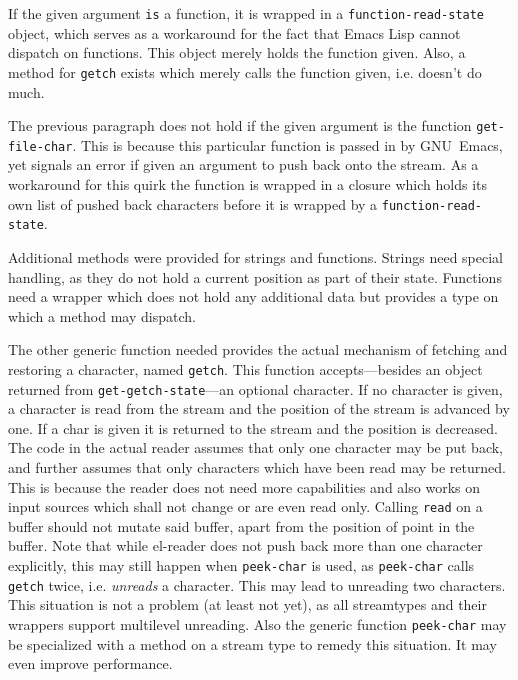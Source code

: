 \documentclass[a4paper,10pt,twoside]{report}
\newcommand{\el}{Emacs Lisp}
\newcommand{\elr}{el-reader}
\newcommand{\sym}[1]{\texttt{#1}}
\newcommand{\fun}[1]{\texttt{#1}}
\newcommand{\emacs}{GNU~Emacs}
\newcommand{\Read}{\fun{read}}
\begin{document}

If the given argument \texttt{is} a function, it is wrapped in a
\sym{function-read-state} object, which serves as a workaround for
the fact that \el{} cannot dispatch on functions.  This object merely holds the
function given.  Also, a method for \fun{getch} exists which merely
calls the function given, i.e. doesn't do much.

The previous paragraph does not hold if the given argument is the function
\fun{get-file-char}.  This is because this particular function is passed in by
\emacs{}, yet signals an error if given an argument to push back onto the
stream.  As a workaround for this quirk the function is wrapped in a closure
which holds its own list of pushed back characters before it is wrapped by a
\sym{function-read-state}.

Additional methods were provided for strings and functions.  Strings need
special handling, as they do not hold a current position as part of their
state.  Functions need a wrapper which does not hold any additional data but
provides a type on which a method may dispatch.

The other generic function needed provides the actual mechanism of fetching and
restoring a character, named \fun{getch}.  This function accepts---besides an
object returned from \fun{get-getch-state}---an optional character.  If no
character is given, a character is read from the stream and the position of the
stream is advanced by one.  If a char is given it is returned to the stream and
the position is decreased.  The code in the actual reader assumes that only one
character may be put back, and further assumes that only characters which have
been read may be returned.  This is because the reader does not need more
capabilities and also works on input sources which shall not change or are even
read only.  Calling \Read{} on a buffer should not mutate said buffer, apart
from the position of point in the buffer.  Note that while \elr{} does not push
back more than one character explicitly, this may still happen when
\fun{peek-char} is used, as \fun{peek-char} calls \fun{getch} twice,
i.e. \emph{unreads} a character.  This may lead to unreading two characters.
This situation is not a problem (at least not yet), as all streamtypes and their
wrappers support multilevel unreading.  Also the generic function
\fun{peek-char} may be specialized with a method on a stream type to remedy this
situation.  It may even improve performance.
\end{document}
